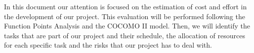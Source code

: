 In this document our attention is focused on the estimation of cost and effort in the development of our project. This evaluation will be performed following the Function Points Analysis and the COCOMO II model.
\newline
Then, we will identify the tasks that are part of our project and their schedule, the allocation of resources for each specific task and the risks that our project has to deal with.
